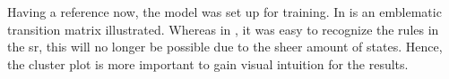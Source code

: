 Having a reference now, the model was set up for training. In \figref{\ref{fig: text model sr}} is an emblematic transition matrix illustrated. Whereas in , it was easy to recognize the rules in the \gls{sr}, this will no longer be possible due to the sheer amount of states. Hence, the cluster plot is more important to gain visual intuition for the results.
%
\begin{figure}
	\centering
		\hfill
\end{figure}
